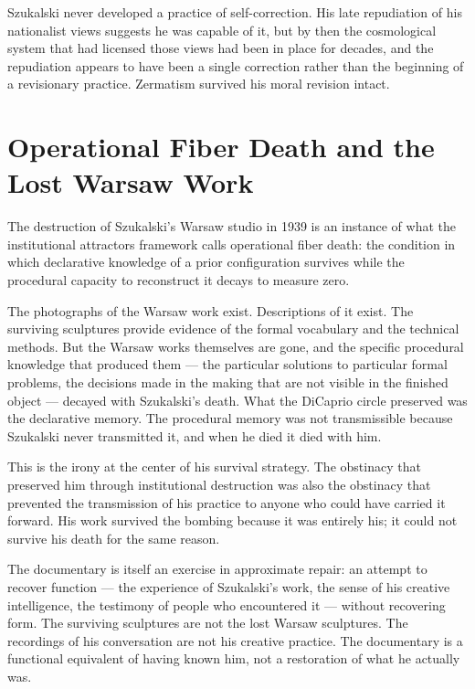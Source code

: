 \documentclass[11pt, a4paper]{article}
\theoremstyle{named}
\begin{document}
Szukalski never developed a practice of self-correction. His late
repudiation of his nationalist views suggests he was capable of it,
but by then the cosmological system that had licensed those views
had been in place for decades, and the repudiation appears to have
been a single correction rather than the beginning of a revisionary
practice. Zermatism survived his moral revision intact.

\section{Operational Fiber Death and the Lost Warsaw Work}

The destruction of Szukalski's Warsaw studio in 1939 is an instance
of what the institutional attractors framework calls operational fiber
death: the condition in which declarative knowledge of a prior
configuration survives while the procedural capacity to reconstruct
it decays to measure zero.

The photographs of the Warsaw work exist. Descriptions of it exist.
The surviving sculptures provide evidence of the formal vocabulary
and the technical methods. But the Warsaw works themselves are gone,
and the specific procedural knowledge that produced them — the
particular solutions to particular formal problems, the decisions made
in the making that are not visible in the finished object — decayed
with Szukalski's death. What the DiCaprio circle preserved was the
declarative memory. The procedural memory was not transmissible
because Szukalski never transmitted it, and when he died it died
with him.

This is the irony at the center of his survival strategy. The
obstinacy that preserved him through institutional destruction was
also the obstinacy that prevented the transmission of his practice
to anyone who could have carried it forward. His work survived the
bombing because it was entirely his; it could not survive his death
for the same reason.

The documentary is itself an exercise in approximate repair: an
attempt to recover function — the experience of Szukalski's work,
the sense of his creative intelligence, the testimony of people who
encountered it — without recovering form. The surviving sculptures
are not the lost Warsaw sculptures. The recordings of his
conversation are not his creative practice. The documentary is a
functional equivalent of having known him, not a restoration of what
he actually was.
\end{document}
